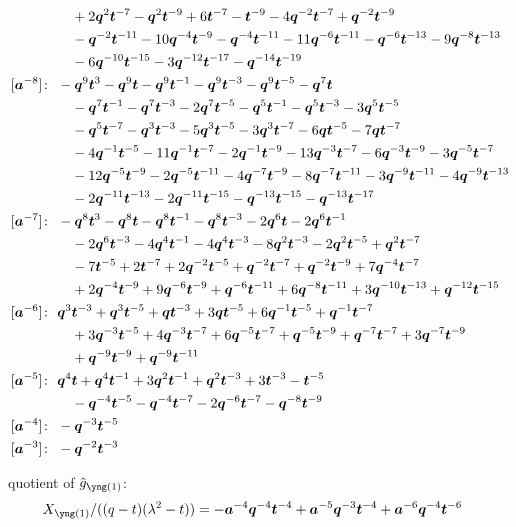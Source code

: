 \begin{align*}
& \quad +2 \bq^{2} \bt^{-7} -\bq^{2} \bt^{-9} +6 \bt^{-7} -\bt^{-9} -4 \bq^{-2} \bt^{-7} +\bq^{-2} \bt^{-9} \\
& \quad -\bq^{-2} \bt^{-11} -10 \bq^{-4} \bt^{-9} -\bq^{-4} \bt^{-11} -11 \bq^{-6} \bt^{-11} -\bq^{-6} \bt^{-13} -9 \bq^{-8} \bt^{-13} \\
& \quad -6 \bq^{-10} \bt^{-15} -3 \bq^{-12} \bt^{-17} -\bq^{-14} \bt^{-19} \\
[\ba^{-8}]\colon\ & -\bq^{9} \bt^{3} -\bq^{9} \bt -\bq^{9} \bt^{-1} -\bq^{9} \bt^{-3} -\bq^{9} \bt^{-5} -\bq^{7} \bt \\
& \quad -\bq^{7} \bt^{-1} -\bq^{7} \bt^{-3} -2 \bq^{7} \bt^{-5} -\bq^{5} \bt^{-1} -\bq^{5} \bt^{-3} -3 \bq^{5} \bt^{-5} \\
& \quad -\bq^{5} \bt^{-7} -\bq^{3} \bt^{-3} -5 \bq^{3} \bt^{-5} -3 \bq^{3} \bt^{-7} -6 \bq \bt^{-5} -7 \bq \bt^{-7} \\
& \quad -4 \bq^{-1} \bt^{-5} -11 \bq^{-1} \bt^{-7} -2 \bq^{-1} \bt^{-9} -13 \bq^{-3} \bt^{-7} -6 \bq^{-3} \bt^{-9} -3 \bq^{-5} \bt^{-7} \\
& \quad -12 \bq^{-5} \bt^{-9} -2 \bq^{-5} \bt^{-11} -4 \bq^{-7} \bt^{-9} -8 \bq^{-7} \bt^{-11} -3 \bq^{-9} \bt^{-11} -4 \bq^{-9} \bt^{-13} \\
& \quad -2 \bq^{-11} \bt^{-13} -2 \bq^{-11} \bt^{-15} -\bq^{-13} \bt^{-15} -\bq^{-13} \bt^{-17} \\
[\ba^{-7}]\colon\ & -\bq^{8} \bt^{3} -\bq^{8} \bt -\bq^{8} \bt^{-1} -\bq^{8} \bt^{-3} -2 \bq^{6} \bt -2 \bq^{6} \bt^{-1} \\
& \quad -2 \bq^{6} \bt^{-3} -4 \bq^{4} \bt^{-1} -4 \bq^{4} \bt^{-3} -8 \bq^{2} \bt^{-3} -2 \bq^{2} \bt^{-5} +\bq^{2} \bt^{-7} \\
& \quad -7 \bt^{-5} +2 \bt^{-7} +2 \bq^{-2} \bt^{-5} +\bq^{-2} \bt^{-7} +\bq^{-2} \bt^{-9} +7 \bq^{-4} \bt^{-7} \\
& \quad +2 \bq^{-4} \bt^{-9} +9 \bq^{-6} \bt^{-9} +\bq^{-6} \bt^{-11} +6 \bq^{-8} \bt^{-11} +3 \bq^{-10} \bt^{-13} +\bq^{-12} \bt^{-15} \\
[\ba^{-6}]\colon\ & \bq^{3} \bt^{-3} +\bq^{3} \bt^{-5} +\bq \bt^{-3} +3 \bq \bt^{-5} +6 \bq^{-1} \bt^{-5} +\bq^{-1} \bt^{-7} \\
& \quad +3 \bq^{-3} \bt^{-5} +4 \bq^{-3} \bt^{-7} +6 \bq^{-5} \bt^{-7} +\bq^{-5} \bt^{-9} +\bq^{-7} \bt^{-7} +3 \bq^{-7} \bt^{-9} \\
& \quad +\bq^{-9} \bt^{-9} +\bq^{-9} \bt^{-11} \\
[\ba^{-5}]\colon\ & \bq^{4} \bt +\bq^{4} \bt^{-1} +3 \bq^{2} \bt^{-1} +\bq^{2} \bt^{-3} +3 \bt^{-3} -\bt^{-5} \\
& \quad -\bq^{-4} \bt^{-5} -\bq^{-4} \bt^{-7} -2 \bq^{-6} \bt^{-7} -\bq^{-8} \bt^{-9} \\
[\ba^{-4}]\colon\ & -\bq^{-3} \bt^{-5} \\
[\ba^{-3}]\colon\ & -\bq^{-2} \bt^{-3}
\end{align*}

quotient of $\hat g_{\yone}$:
\begin{align*}
X_{\yone}/((q - t)(\lambda^2 - t)) &= -\ba^{-4} \bq^{-4} \bt^{-4} +\ba^{-5} \bq^{-3} \bt^{-4} +\ba^{-6} \bq^{-4} \bt^{-6}
\end{align*}
